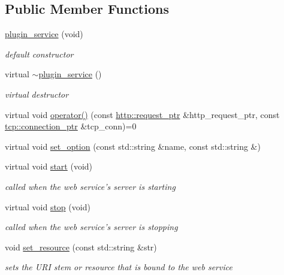 \subsection*{Public Member Functions}
\begin{DoxyCompactItemize}
\item 
\hyperlink{classpion_1_1http_1_1plugin__service_a587b482f3e8d7bd03ac0d7d693538b23}{plugin\-\_\-service} (void)
\begin{DoxyCompactList}\small\item\em default constructor \end{DoxyCompactList}\item 
virtual \hyperlink{classpion_1_1http_1_1plugin__service_a1d7ffeb7d24a0ab951562031b7c16552}{$\sim$plugin\-\_\-service} ()
\begin{DoxyCompactList}\small\item\em virtual destructor \end{DoxyCompactList}\item 
virtual void \hyperlink{classpion_1_1http_1_1plugin__service_afa5beb5af6a667151f21772e476486f7}{operator()} (const \hyperlink{namespacepion_1_1http_ace432b70a9459d50ff4969a7a47f0ccb}{http\-::request\-\_\-ptr} \&http\-\_\-request\-\_\-ptr, const \hyperlink{namespacepion_1_1tcp_a6c9b7497068009f6d81d95ec0b0627d6}{tcp\-::connection\-\_\-ptr} \&tcp\-\_\-conn)=0
\item 
virtual void \hyperlink{classpion_1_1http_1_1plugin__service_ad479991aa66c463cea91e35da717bc0f}{set\-\_\-option} (const std\-::string \&name, const std\-::string \&)
\item 
virtual void \hyperlink{classpion_1_1http_1_1plugin__service_acb534a38c423ead57c98d07077579ecc}{start} (void)
\begin{DoxyCompactList}\small\item\em called when the web service's server is starting \end{DoxyCompactList}\item 
virtual void \hyperlink{classpion_1_1http_1_1plugin__service_a6d8c34f35f95d8e45c5476314bebdf6f}{stop} (void)
\begin{DoxyCompactList}\small\item\em called when the web service's server is stopping \end{DoxyCompactList}\item 
void \hyperlink{classpion_1_1http_1_1plugin__service_a081c90dafdae862ca35b4684eaed4b36}{set\-\_\-resource} (const std\-::string \&str)
\begin{DoxyCompactList}\small\item\em sets the U\-R\-I stem or resource that is bound to the web service \end{DoxyCompactList}\item 

\end{DoxyCompactItemize}
